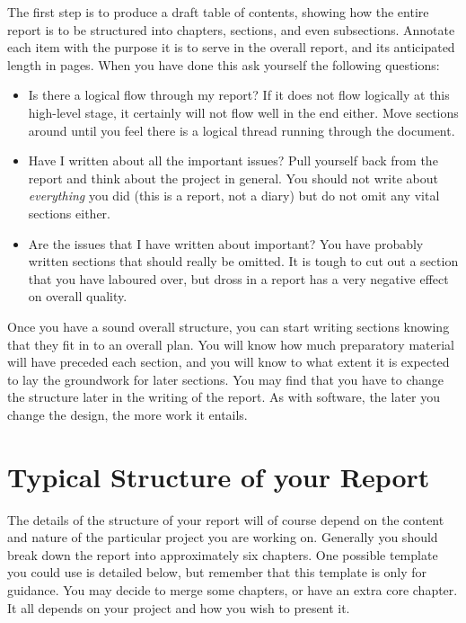 \documentclass[]{final_report}
\begin{document}
The first step is to produce a draft table of contents, showing how the entire report is to be structured into chapters, sections, and even subsections. Annotate each item with the purpose it is to serve in the overall report, and its anticipated length in pages. When you have done this ask yourself the following questions:

\begin{itemize}
\item Is there a logical flow through my report? If it does not flow logically at this high-level stage, it certainly will not flow well in the end either. Move sections around until you feel there is a logical thread running through the document.
\item Have I written about all the important issues? Pull yourself back from the report and think about the project in general. You should not write about {\sl everything} you did (this is a report, not a diary) but do not omit any vital sections either.
\item Are the issues that I have written about important? You have probably written sections that should really be omitted. It is tough to cut out a section that you have laboured over, but dross in a report has a very negative effect on overall quality.
\end{itemize}

Once you have a sound overall structure, you can start writing sections knowing that they fit in to an overall plan. You will know how much preparatory material will have preceded each section, and you will know to what extent it is expected to lay the groundwork for later sections. You may find that you have to change the structure later in the writing of the report. As with software, the later you change the design, the more work it entails.


\section{Typical Structure of your Report}

The details of the structure of your report will of course depend on the content and nature of the particular project you are working on. Generally you should break down the report into approximately six chapters. One possible template you could use is detailed below, but remember that this template is only for guidance. You may decide to merge some chapters, or have an extra core chapter. It all depends on your project and how you wish to present it.
\end{document}
